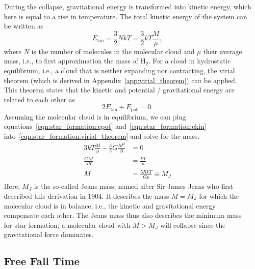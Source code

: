 During the collapse, gravitational energy is transformed into kinetic energy, which here is equal to a rise in temperature. The total kinetic energy of the system can be written as
\begin{equation}
    E_\mathrm{kin} = \frac{3}{2} NkT = \frac{3}{2} kT \frac{M}{\mu}, \label{eqn:star_formation:ekin}
\end{equation}
where $N$ is the number of molecules in the molecular cloud and $\mu$ their average mass, i.e., to first approximation the mass of H$_2$.
For a cloud in hydrostatic equilibrium, i.e., a cloud that is neither expanding nor contracting, the virial theorem (which is derived in Appendix~\ref{app:virial_theorem}) can be applied. This theorem states that the kinetic and potential / gravitational energy are related to each other as
\begin{equation}
    2 E_\mathrm{kin} + E_\mathrm{pot} = 0. \label{eqn:star_formation:virial_theorem}
\end{equation}
Assuming the molecular cloud is in equilibrium, we can plug equations~\eqref{eqn:star_formation:epot} and~\eqref{eqn:star_formation:ekin} into~\eqref{eqn:star_formation:virial_theorem} and solve for the mass.
\begin{equation}
    \begin{aligned}
        3 kT \frac{M}{\mu} - \frac{3}{5}G \frac{M^2}{R} &= 0\\
        \frac{GM}{5R} &= \frac{kT}{\mu}\\
        M &= \frac{5RkT}{G\mu} \equiv M_J
    \end{aligned}\label{eqn:star_formation:jeans_mass_derivation}
\end{equation}
Here, $M_J$ is the so-called Jeans mass, named after Sir James Jeans who first described this derivation in 1904. It describes the mass $M=M_J$ for which the molecular cloud is in balance, i.e., the kinetic and gravitational energy compensate each other. The Jeans mass thus also describes the minimum mass for star formation; a molecular cloud with $M>M_J$ will collapse since the gravitational force dominates.


\subsection{Free Fall Time}

